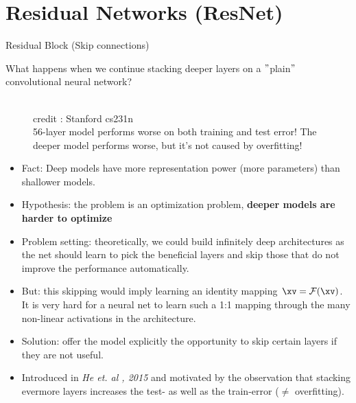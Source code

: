 
\section{Residual Networks (ResNet)}


\begin{vbframe}{Residual Block (Skip connections)}

What happens when we continue stacking deeper layers on a $"$plain$"$ convolutional
neural network?
      \begin{figure}
    \centering
    \tiny{\\ credit : Stanford cs231n}
    \tiny{\\56-layer model performs worse on both training and test error! The deeper model performs worse, but it's not caused by overfitting!}
  \end{figure}
    

    \begin{itemize}
        \item Fact: Deep models have more representation power (more parameters) than shallower models.
        \item Hypothesis: the problem is an optimization problem, \textbf{deeper models are harder to optimize}
        \item Problem setting: theoretically, we could build infinitely deep architectures as the net should learn to pick the beneficial layers and skip those that do not improve the performance automatically.
        \item But: this skipping would imply learning an identity mapping $\xv = \mathcal{F}(\xv)$. It is very hard for a neural net to learn such a 1:1 mapping through the many non-linear activations in the architecture.
        \item Solution: offer the model explicitly the opportunity to skip certain layers if they are not useful.
        \item Introduced in \textit{He et. al , 2015} and motivated by the observation that stacking evermore layers increases the test- as well as the train-error ($\neq$ overfitting).
    \end{itemize}
    

\end{vbframe}
